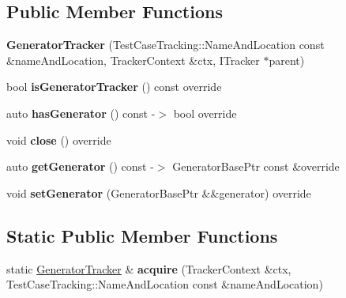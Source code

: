 \subsection*{Public Member Functions}
\begin{DoxyCompactItemize}
\item 
\mbox{\label{structCatch_1_1Generators_1_1GeneratorTracker_aa70d62ac075d47401cfad669fbb15057}} 
{\bfseries Generator\+Tracker} (Test\+Case\+Tracking\+::\+Name\+And\+Location const \&name\+And\+Location, Tracker\+Context \&ctx, I\+Tracker $\ast$parent)
\item 
\mbox{\label{structCatch_1_1Generators_1_1GeneratorTracker_a58f3a500872cec6bfd1c9e605c06294f}} 
bool {\bfseries is\+Generator\+Tracker} () const override
\item 
\mbox{\label{structCatch_1_1Generators_1_1GeneratorTracker_ae798faa657dc7eba5b1e866cfe824a4b}} 
auto {\bfseries has\+Generator} () const -\/$>$ bool override
\item 
\mbox{\label{structCatch_1_1Generators_1_1GeneratorTracker_afb933cbb4007f63adb137bd961836165}} 
void {\bfseries close} () override
\item 
\mbox{\label{structCatch_1_1Generators_1_1GeneratorTracker_a902884030ef21d5eca2e7b78e36750c5}} 
auto {\bfseries get\+Generator} () const -\/$>$ Generator\+Base\+Ptr const \&override
\item 
\mbox{\label{structCatch_1_1Generators_1_1GeneratorTracker_a89ebb06a194997b2870e258b609ea296}} 
void {\bfseries set\+Generator} (Generator\+Base\+Ptr \&\&generator) override
\end{DoxyCompactItemize}
\subsection*{Static Public Member Functions}
\begin{DoxyCompactItemize}
\item 
\mbox{\label{structCatch_1_1Generators_1_1GeneratorTracker_a57ee9aa54af9ca7d9d97b14affcf0d99}} 
static \hyperlink{structCatch_1_1Generators_1_1GeneratorTracker}{Generator\+Tracker} \& {\bfseries acquire} (Tracker\+Context \&ctx, Test\+Case\+Tracking\+::\+Name\+And\+Location const \&name\+And\+Location)
\end{DoxyCompactItemize}
